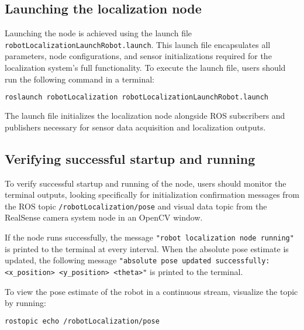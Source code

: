 \documentclass{CSSRforAfrica}
\begin{document}
\subsection*{Launching the localization node}

Launching the node is achieved using the launch file \texttt{robotLocalizationLaunchRobot.launch}. This launch file encapsulates all parameters, node configurations, and sensor initializations required for the localization system’s full functionality. To execute the launch file, users should run the following command in a terminal:

\begin{lstlisting}[style=withoutNumbering, language=bash]
    roslaunch robotLocalization robotLocalizationLaunchRobot.launch
\end{lstlisting}

The launch file initializes the localization node alongside ROS subscribers and publishers necessary for sensor data acquisition and localization outputs.

\subsection*{Verifying successful startup and running}

To verify successful startup and running of the node, users should monitor the terminal outputs, looking specifically for initialization confirmation messages from the ROS topic \texttt{/robotLocalization/pose} and visual data topic from the RealSense camera system node in an OpenCV window. 

If the node runs successfully, the message \texttt{"robot localization node running"} is printed to the terminal at every interval. When the absolute pose estimate is updated, the following message \texttt{"absolute pose updated successfully:<x\_position> <y\_position> <theta>"} is printed to the terminal.

To view the pose estimate of the robot in a continuous stream, visualize the topic by running:

\begin{lstlisting}[style=withoutNumbering, language=bash]
    rostopic echo /robotLocalization/pose
\end{lstlisting}




\end{document}
